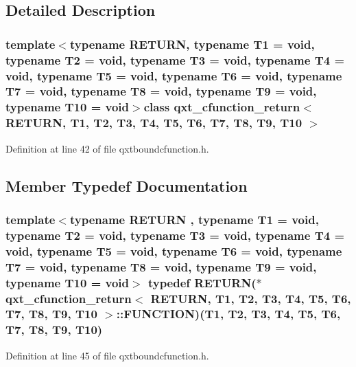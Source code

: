 \subsection{Detailed Description}
\subsubsection*{template$<$typename R\-E\-T\-U\-R\-N, typename T1 = void, typename T2 = void, typename T3 = void, typename T4 = void, typename T5 = void, typename T6 = void, typename T7 = void, typename T8 = void, typename T9 = void, typename T10 = void$>$class qxt\-\_\-cfunction\-\_\-return$<$ R\-E\-T\-U\-R\-N, T1, T2, T3, T4, T5, T6, T7, T8, T9, T10 $>$}



Definition at line 42 of file qxtboundcfunction.\-h.



\subsection{Member Typedef Documentation}
\hypertarget{classqxt__cfunction__return_a64d12f4d16cc4a0c6764fccf2c289072}{
\subsubsection[{F\-U\-N\-C\-T\-I\-O\-N}]{\setlength{\rightskip}{0pt plus 5cm}template$<$typename R\-E\-T\-U\-R\-N , typename T1  = void, typename T2  = void, typename T3  = void, typename T4  = void, typename T5  = void, typename T6  = void, typename T7  = void, typename T8  = void, typename T9  = void, typename T10  = void$>$ typedef R\-E\-T\-U\-R\-N($\ast$ {\bf qxt\-\_\-cfunction\-\_\-return}$<$ R\-E\-T\-U\-R\-N, T1, T2, T3, T4, T5, T6, T7, T8, T9, T10 $>$\-::F\-U\-N\-C\-T\-I\-O\-N)(T1, T2, T3, T4, T5, T6, T7, T8, T9, T10)}}\label{classqxt__cfunction__return_a64d12f4d16cc4a0c6764fccf2c289072}


Definition at line 45 of file qxtboundcfunction.\-h.



